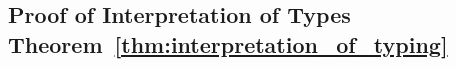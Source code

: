 \subsection{Proof of Interpretation of Types Theorem~\ref{thm:interpretation_of_typing}}
\label{subsec:proof_of_interpretation_of_types}
\begin{comment}



  


  
  




\end{comment}
